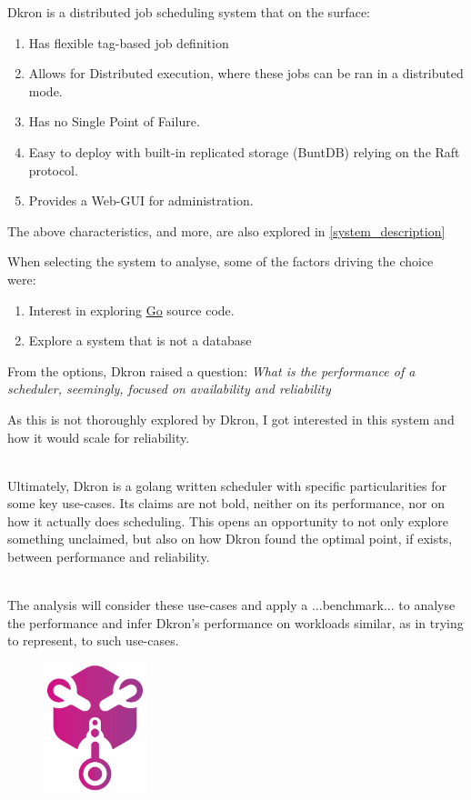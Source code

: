 \documentclass[runningheads]{llncs}
\begin{document}
Dkron is a distributed job scheduling system that on the surface:

\begin{enumerate}
    \item Has flexible tag-based job definition
    \item Allows for Distributed execution, where these jobs can be ran in a distributed mode. %
    \item Has no Single Point of Failure.
    \item Easy to deploy with built-in replicated storage (BuntDB) relying on the Raft protocol.
    \item Provides a Web-GUI for administration.
\end{enumerate}
The above characteristics, and more, are also explored in \ref{system_description}

\break
When selecting the system to analyse, some of the factors driving the choice were:
\begin{enumerate}
    \item Interest in exploring \href{https://go.dev/}{Go} source code.
    \item Explore a system that is not a database
\end{enumerate}
From the options, Dkron raised a question:
\textit{What is the performance of a scheduler, seemingly, focused on availability and reliability}

As this is not thoroughly explored by Dkron, I got interested in this system and how it would scale
for reliability.

~\\
Ultimately, Dkron is a golang written scheduler with specific particularities for some key use-cases.
Its claims are not bold, neither on its performance, nor on how it actually does scheduling. This opens an
opportunity to not only explore something unclaimed, but also on how Dkron found the
optimal point, if exists, between performance and reliability.

~\\ The analysis will consider these use-cases and apply a ...benchmark... to analyse the performance and infer Dkron's
performance on workloads similar, as in trying to represent, to such use-cases.

\begin{figure}[h]
\centering
\includegraphics[width=3cm]{media/dkron-logo.png}
\end{figure}
\end{document}
